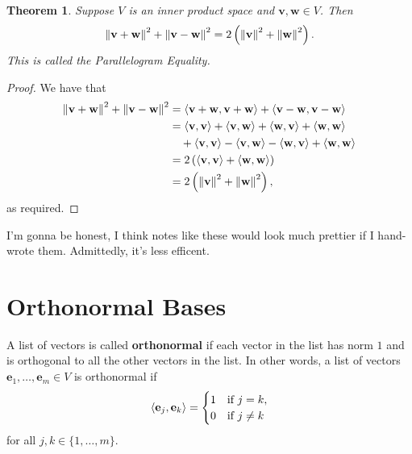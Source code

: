 \documentclass[11pt]{article}
\renewcommand{\vec}[1]{\mathbf{#1}}
\newtheorem{theorem}{Theorem}
\begin{document}
\begin{theorem}
		Suppose $V$ is an inner product space and $\vec{v}, \vec{w} \in V$. Then 
		\[
			\norm{\vec{v} + \vec{w}}^{2} + \norm{\vec{v} - \vec{w}}^{2} = 2 \left( \norm{\vec{v}}^{2} + \norm{\vec{w}}^{2} \right).
		\]
		This is called the Parallelogram Equality.
\end{theorem}
\begin{adjustwidth}{1cm}{}
	\begin{proof}
		We have that
		\begin{align*}
			\norm{\vec{v} + \vec{w}}^{2} + \norm{\vec{v} - \vec{w}}^{2} &= \ev{\vec{v} + \vec{w}, \vec{v} + \vec{w}} + \ev{\vec{v} - \vec{w}, \vec{v} - \vec{w}} \\ 
			&= \ev{\vec{v}, \vec{v}} + \ev{\vec{v}, \vec{w}} + \ev{\vec{w}, \vec{v}} + \ev{\vec{w}, \vec{w}} \\
			& \quad + \ev{\vec{v}, \vec{v}} - \ev{\vec{v}, \vec{w}} - \ev{\vec{w}, \vec{v}} + \ev{\vec{w}, \vec{w}} \\
			&= 2 \left( \ev{\vec{v}, \vec{v}} + \ev{\vec{w}, \vec{w}} \right) \\
			&= 2 \left( \norm{\vec{v}}^{2} + \norm{\vec{w}}^{2} \right),
		\end{align*}
		as required.
	\end{proof}
\end{adjustwidth}

I'm gonna be honest, I think notes like these would look much prettier if I hand-wrote them. Admittedly, it's less efficent.

\newpage


\section{Orthonormal Bases}


A list of vectors is called \textbf{orthonormal} if each vector in the list has norm $1$ and is orthogonal to all the other vectors in the list. In other words, a list of vectors $\vec{e}_{1}, \ldots, \vec{e}_{m} \in V$ is orthonormal if
\[
	\ev{\vec{e}_{j}, \vec{e}_{k}} =
	\begin{cases}
		1 & \text{if } j = k, \\
		0 & \text{if } j \ne k
	\end{cases}
\]
for all $j, k \in \{ 1, \ldots, m \}$.
\end{document}
